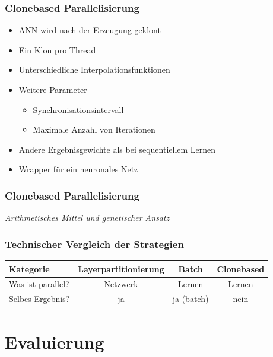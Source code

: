 \documentclass[18pt]{beamer}
\begin{document}
	\begin{frame}\frametitle{Clonebased Parallelisierung}
		\begin{itemize}
			\item ANN wird nach der Erzeugung \glqq geklont\grqq
			\item Ein Klon pro Thread
			\item Unterschiedliche Interpolationsfunktionen
			\item Weitere Parameter
			\begin{itemize}
				\item Synchronisationsintervall
				\item Maximale Anzahl von Iterationen
			\end{itemize}				
			\item Andere Ergebnisgewichte als bei sequentiellem Lernen
			\item Wrapper für ein neuronales Netz
		\end{itemize}
	\end{frame}
	
	\begin{frame}\frametitle{Clonebased Parallelisierung}
		\textit{Arithmetisches Mittel und genetischer Ansatz}
	\end{frame}



	\begin{frame}[c]\frametitle{Technischer Vergleich der Strategien}	
		\begin{tabular}{l|c|c|c|}

		Kategorie &Layerpartitionierung & Batch & Clonebased \\
		\hline
		Was ist parallel? & Netzwerk & Lernen & Lernen\\
		Selbes Ergebnis? & ja & ja (batch) & nein \\

		\end{tabular}
	
	\end{frame}


	\section{Evaluierung}
\end{document}
